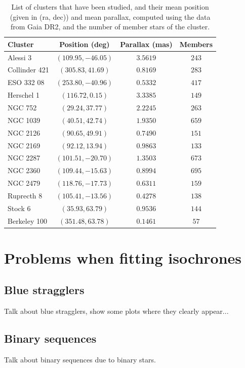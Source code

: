 \documentclass[twocolumn]{revtex4}
\begin{document}
\begin{table}[h!]
\begin{tabular}{|l|c|c|c|}
\hline
\textbf{Cluster} & \textbf{Position (deg)} & \textbf{Parallax (mas)} & \textbf{Members} \\
\hline
Alessi 3 & $(109.95, -46.05)$ & $3.5619$ & $243$ \\
\hline
Collinder 421 & $(305.83, 41.69)$ & $0.8169$ & $283$ \\
\hline
ESO 332 08 & $(253.80, -40.96)$ & $0.5332$ & $417$ \\
\hline
Herschel 1 & $(116.72, 0.15)$ & $3.3385$ & $149$ \\
\hline
NGC 752 & $(29.24, 37.77)$ & $2.2245$ & $263$ \\
\hline
NGC 1039 & $(40.51, 42.74)$ & $1.9350$ & $659$ \\
\hline
NGC 2126 & $(90.65, 49.91)$ & $0.7490$ & $151$ \\
\hline
NGC 2169 & $(92.12, 13.94)$ & $0.9863$ & $133$ \\
\hline
NGC 2287 & $(101.51, -20.70)$ & $1.3503$ & $673$ \\
\hline
NGC 2360 & $(109.44, -15.63)$ & $0.8994$ & $695$ \\
\hline
NGC 2479 & $(118.76, -17.73)$ & $0.6311$ & $159$ \\
\hline
Ruprecth 8 & $(105.41, -13.56)$ & $0.4278$ & $138$ \\
\hline
Stock 6 & $(35.93, 63.79)$ & $0.9536$ & $144$ \\
\hline
Berkeley 100 & $(351.48, 63.78)$ & $0.1461$ & $57$ \\
\hline
\end{tabular}
\caption{List of clusters that have been studied, and their mean position (given in (ra, dec)) and mean parallax, computed using the data from Gaia DR2, and the number of member stars of the cluster.} %
\label{tab:clusters}
\end{table} 

\section{Problems when fitting isochrones}
\subsection{Blue stragglers}
Talk about blue stragglers, show some plots where they clearly appear...

\subsection{Binary sequences}
Talk about binary sequences due to binary stars.
\end{document}
